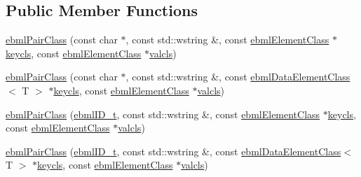 \subsection*{Public Member Functions}
\begin{DoxyCompactItemize}
\item 
\mbox{\hyperlink{classebml_1_1ebmlPairClass_aeb7ee60aa846a317cecc39c5c79aeb2e}{ebml\+Pair\+Class}} (const char $\ast$, const std\+::wstring \&, const \mbox{\hyperlink{classebml_1_1ebmlElementClass}{ebml\+Element\+Class}} $\ast$\mbox{\hyperlink{classebml_1_1ebmlPairClass_a94538c4319b9d572bce2c05f6d999410}{keycls}}, const \mbox{\hyperlink{classebml_1_1ebmlElementClass}{ebml\+Element\+Class}} $\ast$\mbox{\hyperlink{classebml_1_1ebmlPairClass_ac4726d7f429838e8ec8e2d294b680a3d}{valcls}})
\item 
\mbox{\hyperlink{classebml_1_1ebmlPairClass_a2830fdd542ad3a6d25dba990956e0818}{ebml\+Pair\+Class}} (const char $\ast$, const std\+::wstring \&, const \mbox{\hyperlink{classebml_1_1ebmlDataElementClass}{ebml\+Data\+Element\+Class}}$<$ T $>$ $\ast$\mbox{\hyperlink{classebml_1_1ebmlPairClass_a94538c4319b9d572bce2c05f6d999410}{keycls}}, const \mbox{\hyperlink{classebml_1_1ebmlElementClass}{ebml\+Element\+Class}} $\ast$\mbox{\hyperlink{classebml_1_1ebmlPairClass_ac4726d7f429838e8ec8e2d294b680a3d}{valcls}})
\item 
\mbox{\hyperlink{classebml_1_1ebmlPairClass_ab1d08a05b102e555cb16e3416dda5fec}{ebml\+Pair\+Class}} (\mbox{\hyperlink{namespaceebml_a86c5f604ddf12a74aa9812e997a58691}{ebml\+I\+D\+\_\+t}}, const std\+::wstring \&, const \mbox{\hyperlink{classebml_1_1ebmlElementClass}{ebml\+Element\+Class}} $\ast$\mbox{\hyperlink{classebml_1_1ebmlPairClass_a94538c4319b9d572bce2c05f6d999410}{keycls}}, const \mbox{\hyperlink{classebml_1_1ebmlElementClass}{ebml\+Element\+Class}} $\ast$\mbox{\hyperlink{classebml_1_1ebmlPairClass_ac4726d7f429838e8ec8e2d294b680a3d}{valcls}})
\item 
\mbox{\hyperlink{classebml_1_1ebmlPairClass_a399efa1fe09fc7c381081a121cb039f7}{ebml\+Pair\+Class}} (\mbox{\hyperlink{namespaceebml_a86c5f604ddf12a74aa9812e997a58691}{ebml\+I\+D\+\_\+t}}, const std\+::wstring \&, const \mbox{\hyperlink{classebml_1_1ebmlDataElementClass}{ebml\+Data\+Element\+Class}}$<$ T $>$ $\ast$\mbox{\hyperlink{classebml_1_1ebmlPairClass_a94538c4319b9d572bce2c05f6d999410}{keycls}}, const \mbox{\hyperlink{classebml_1_1ebmlElementClass}{ebml\+Element\+Class}} $\ast$\mbox{\hyperlink{classebml_1_1ebmlPairClass_ac4726d7f429838e8ec8e2d294b680a3d}{valcls}})
\item 

\end{DoxyCompactItemize}
